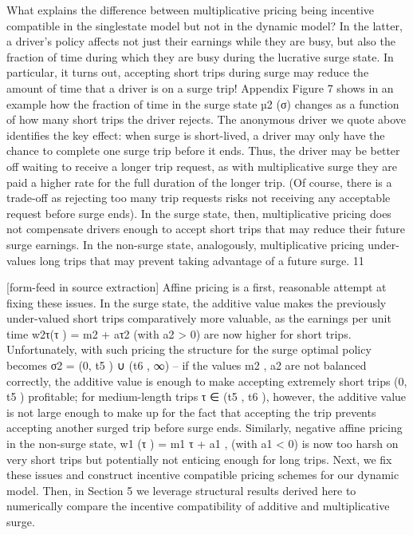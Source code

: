 \documentclass[10pt]{article}
\begin{document}
\begin{ReviewVerbatim}
What explains the difference between multiplicative pricing being incentive compatible in the singlestate model but not in the dynamic model? In the latter, a driver’s policy affects not just their
earnings while they are busy, but also the fraction of time during which they are busy during the
lucrative surge state. In particular, it turns out, accepting short trips during surge may reduce the
amount of time that a driver is on a surge trip! Appendix Figure 7 shows in an example how the
fraction of time in the surge state µ2 (σ) changes as a function of how many short trips the driver
rejects.
The anonymous driver we quote above identifies the key effect: when surge is short-lived, a
driver may only have the chance to complete one surge trip before it ends. Thus, the driver may
be better off waiting to receive a longer trip request, as with multiplicative surge they are paid
a higher rate for the full duration of the longer trip. (Of course, there is a trade-off as rejecting
too many trip requests risks not receiving any acceptable request before surge ends). In the surge
state, then, multiplicative pricing does not compensate drivers enough to accept short trips that
may reduce their future surge earnings. In the non-surge state, analogously, multiplicative pricing
under-values long trips that may prevent taking advantage of a future surge.
11


[form-feed in source extraction]
Affine pricing is a first, reasonable attempt at fixing these issues. In the surge state, the additive
value makes the previously under-valued short trips comparatively more valuable, as the earnings
per unit time w2τ(τ ) = m2 + aτ2 (with a2 > 0) are now higher for short trips. Unfortunately, with
such pricing the structure for the surge optimal policy becomes σ2 = (0, t5 ) ∪ (t6 , ∞) – if the values
m2 , a2 are not balanced correctly, the additive value is enough to make accepting extremely short
trips (0, t5 ) profitable; for medium-length trips τ ∈ (t5 , t6 ), however, the additive value is not large
enough to make up for the fact that accepting the trip prevents accepting another surged trip
before surge ends. Similarly, negative affine pricing in the non-surge state, w1 (τ ) = m1 τ + a1 , (with
a1 < 0) is now too harsh on very short trips but potentially not enticing enough for long trips.
Next, we fix these issues and construct incentive compatible pricing schemes for our dynamic
model. Then, in Section 5 we leverage structural results derived here to numerically compare the
incentive compatibility of additive and multiplicative surge.


\end{ReviewVerbatim}
\end{document}
